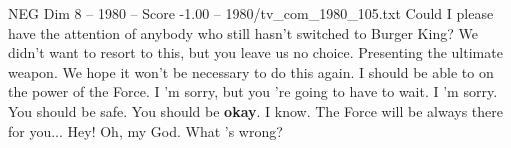 \begin{textsample}{NEG Dim 8 – 1980 – Score -1.00 – 1980/tv\_com\_1980\_105.txt}  \label{ex:f8_neg_052}
Could I please have the attention of anybody who still hasn't switched to Burger King?
We didn't want to resort to this, but you leave us no choice.
Presenting the ultimate weapon.
We hope it won't be necessary to do this again.
I should be able to on the power of the Force.
I 'm sorry, but you 're going to have to wait.
I 'm sorry.
You should be safe.
You should be \textbf{okay}.
I know.
The Force will be always there for you...
Hey!
Oh, my God.
What 's wrong?

\end{textsample}
